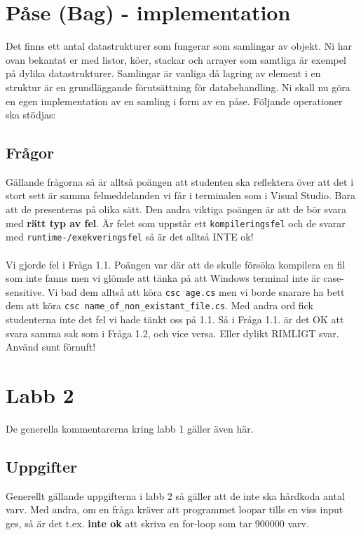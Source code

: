 \documentclass{article}
\begin{document}
  \section*{Påse (Bag) - implementation}
  Det finns ett antal datastrukturer som fungerar som samlingar av objekt. Ni har ovan bekantat
  er med listor, köer, stackar och arrayer som samtliga är exempel på dylika datastrukturer.
  Samlingar är vanliga då lagring av element i en struktur är en grundläggande förutsättning
  för databehandling. Ni skall nu göra en egen implementation av en samling i form av en
  påse. Följande operationer ska stödjas:
  
  



  \subsection*{Frågor}
  Gällande frågorna så är alltså poängen att studenten ska reflektera över att det i stort sett är samma felmeddelanden vi får i terminalen som i Visual Studio. Bara att de presenteras på olika sätt. Den andra viktiga poängen är att de bör svara med \textbf{rätt typ av fel}. Är felet som uppstår ett \texttt{kompileringsfel} och de svarar med \texttt{runtime-/exekveringsfel} så är det alltså INTE ok!

  \paragraph{}
  Vi gjorde fel i Fråga 1.1. Poängen var där att de skulle försöka kompilera en fil som inte fanns men vi glömde att tänka på att Windows terminal inte är case-sensitive. Vi bad dem alltså att köra \texttt{csc age.cs} men vi borde snarare ha bett dem att köra \texttt{csc name\_of\_non\_existant\_file.cs}. Med andra ord fick studenterna inte det fel vi hade tänkt oss på 1.1. Så i Fråga 1.1. är det OK att svara samma sak som i Fråga 1.2, och vice versa. Eller dylikt RIMLIGT svar. Använd sunt förnuft!



  \section*{Labb 2}
  De generella kommentarerna kring labb 1 gäller även här.

  \subsection*{Uppgifter}
  Generellt gällande uppgifterna i labb 2 så gäller att de inte ska hårdkoda antal varv. Med andra, om en fråga kräver att programmet loopar tills en viss input ges, så är det t.ex. \textbf{inte ok} att skriva en for-loop som tar 900000 varv.
\end{document}
